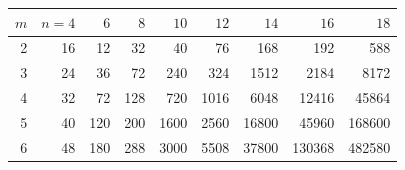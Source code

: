 \begin{tabular}{rrrrrrrrr}\toprule $m$ & $n{=}4$ & $6$ & $8$ & $10$ & $12$ & $14$ & $16$ & $18$\\\midrule
2 & 16 & 12 & 32 & 40 & 76 & 168 & 192 & 588\\
3 & 24 & 36 & 72 & 240 & 324 & 1512 & 2184 & 8172\\
4 & 32 & 72 & 128 & 720 & 1016 & 6048 & 12416 & 45864\\
5 & 40 & 120 & 200 & 1600 & 2560 & 16800 & 45960 & 168600\\
6 & 48 & 180 & 288 & 3000 & 5508 & 37800 & 130368 & 482580\\
\bottomrule\end{tabular}
